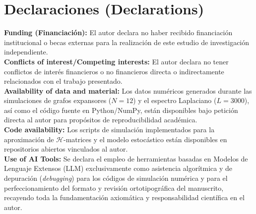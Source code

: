 \documentclass[sn-mathphys]{sn-jnl}
\begin{document}
\section*{Declaraciones (Declarations)}
\textbf{Funding (Financiación):} El autor declara no haber recibido financiación institucional o becas externas para la realización de este estudio de investigación independiente.\\
\textbf{Conflicts of interest/Competing interests:} El autor declara no tener conflictos de interés financieros o no financieros directa o indirectamente relacionados con el trabajo presentado.\\
\textbf{Availability of data and material:} Los datos numéricos generados durante las simulaciones de grafos expansores ($N=12$) y el espectro Laplaciano ($L=3000$), así como el código fuente en Python/NumPy, están disponibles bajo petición directa al autor para propósitos de reproducibilidad académica.\\
\textbf{Code availability:} Los scripts de simulación implementados para la aproximación de $\mathcal{H}$-matrices y el modelo estocástico están disponibles en repositorios abiertos vinculados al autor.\\
\textbf{Use of AI Tools:} Se declara el empleo de herramientas basadas en Modelos de Lenguaje Extensos (LLM) exclusivamente como asistencia algorítmica y de depuración (\textit{debugging}) para los códigos de simulación numérica y para el perfeccionamiento del formato y revisión ortotipográfica del manuscrito, recayendo toda la fundamentación axiomática y responsabilidad científica en el autor.
\end{document}
